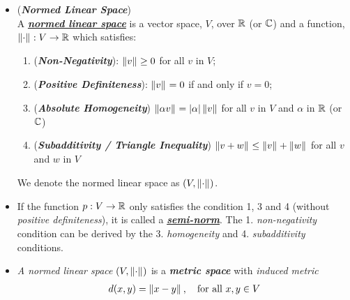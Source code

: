 \documentclass[11pt]{article}
\begin{document}
\begin{itemize}
\item \begin{definition} (\emph{\textbf{Normed Linear Space}})\\
A \underline{\emph{\textbf{normed linear space}}} is a vector space, $V$, over ${\mathbb R}$ (or ${\mathbb C}$) and a function, $\left\|\cdot\right\|_{}: V \rightarrow {\mathbb R}$ which satisfies:
\begin{enumerate}
\item (\emph{\textbf{Non-Negativity}}): $\left\|v\right\|_{} \ge 0$ for all $v$ in $V$;
\item (\emph{\textbf{Positive Definiteness}}): $\left\|v\right\|_{} = 0$ if and only if $v = 0$;
\item (\emph{\textbf{Absolute Homogeneity}}) $\left\|\alpha v\right\|_{} = \left\lvert \alpha \right\rvert\left\|v\right\|_{}$ for all $v$ in $V$ and $\alpha$ in ${\mathbb R}$ (or ${\mathbb C}$)
\item (\emph{\textbf{Subadditivity / Triangle Inequality}}) $\left\|v + w\right\|_{}\le \left\|v\right\|_{} + \left\|w\right\|_{}$ for all $v$ and $w$ in $V$
\end{enumerate}
We denote the normed linear space as $(V, \left\|\cdot\right\|_{})$.
\end{definition}

\item \begin{remark}
If the function $p: V \rightarrow {\mathbb R}$ only satisfies the condition 1, 3 and 4 (without \emph{positive definiteness}), it is called a \underline{\emph{\textbf{semi-norm}}}. The 1. \emph{non-negativity} condition can be derived by the 3. \emph{homogeneity} and 4. \emph{subadditivity} conditions. 
\end{remark}

\item \begin{remark}
\emph{A normed linear space} $(V, \left\|\cdot\right\|_{})$ is a \emph{\textbf{metric space}} with \emph{induced metric }
\begin{align*}
d(x, y) = \left\|x - y\right\|_{}, \quad \text{for all } x, y \in V
\end{align*}
\end{remark}




\end{itemize}
\end{document}

